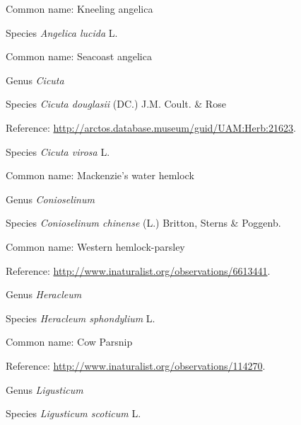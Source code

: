 \documentclass[9pt, article]{memoir}
\begin{document}
\begin{multicols}{2}
Common name: Kneeling angelica

\vspace{6pt}\noindent\hspace{36pt}Species \textit{Angelica lucida} L.


Common name: Seacoast angelica

\vspace{6pt}\noindent\hspace{30pt}Genus \textit{Cicuta}


\vspace{6pt}\noindent\hspace{36pt}Species \textit{Cicuta douglasii} (DC.) J.M. Coult. \& Rose


Reference: 
\url{http://arctos.database.museum/guid/UAM:Herb:21623}.

\vspace{6pt}\noindent\hspace{36pt}Species \textit{Cicuta virosa} L.


Common name: Mackenzie's water hemlock

\vspace{6pt}\noindent\hspace{30pt}Genus \textit{Conioselinum}


\vspace{6pt}\noindent\hspace{36pt}Species \textit{Conioselinum chinense} (L.) Britton, Sterns \& Poggenb.


Common name: Western hemlock-parsley

Reference: 
\url{http://www.inaturalist.org/observations/6613441}.

\vspace{6pt}\noindent\hspace{30pt}Genus \textit{Heracleum}


\vspace{6pt}\noindent\hspace{36pt}Species \textit{Heracleum sphondylium} L.


Common name: Cow Parsnip

Reference: 
\url{http://www.inaturalist.org/observations/114270}.

\vspace{6pt}\noindent\hspace{30pt}Genus \textit{Ligusticum}


\vspace{6pt}\noindent\hspace{36pt}Species \textit{Ligusticum scoticum} L.



\end{multicols}
\end{document}
